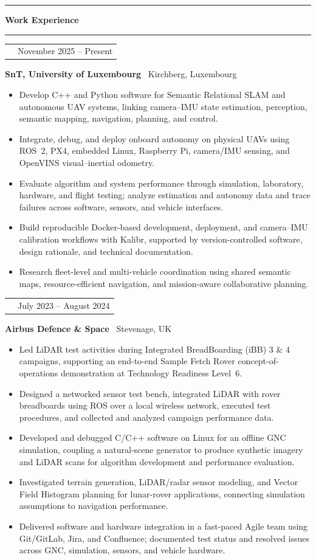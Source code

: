 \documentclass[10pt,a4paper]{article}
\makeatletter
\newcommand{\SectionSize}{11.5pt}
\newcommand{\RoleSize}{10.3pt}
\newcommand{\CompanySize}{9.6pt}
\newcommand{\DurationSize}{9pt}
\newcommand{\BodySize}{9.2pt}
\newcommand{\SectionLineSize}{12pt}
\newcommand{\RoleLineSize}{11.5pt}
\newcommand{\CompanyLineSize}{10.8pt}
\newcommand{\DurationLineSize}{9pt}
\newcommand{\BodyLineSize}{11pt}
\newcommand{\HeaderAfter}{-5pt}
\newcommand{\StatementAfter}{4pt}
\newcommand{\SectionBefore}{4pt}
\newcommand{\SectionTitleToLine}{2pt}
\newcommand{\SectionLineToEntry}{0pt}
\newcommand{\EntryBefore}{0pt}
\newcommand{\RoleToCompany}{-5pt}
\newcommand{\CompanyToBullets}{3pt}
\newcommand{\EntryAfter}{6pt}
\newcommand{\BulletSpacing}{2pt}
\newcommand{\BulletBefore}{0pt}
\newcommand{\BulletIndent}{1.25em}
\newcommand{\SubsectionLineThickness}{0.4pt}
\newcommand{\CVLineThickness}{0.5pt}
\newcommand{\DurationWidth}{4.5cm}
\newcommand{\CVLine}{
    \vspace{\HeaderAfter}
    \noindent
    \textcolor{CVBlack}{
        \rule{\textwidth}{\CVLineThickness}
    }
    \vspace{\HeaderAfter}
}
\newcommand{\CVFirstSection}[1]{

    \vspace{\SectionBefore}


    {\fontsize{\SectionSize}{\SectionLineSize}
    \selectfont
    \textbf{\textcolor{CVBlack}{#1}}}

    \vspace{\SectionTitleToLine}


    \noindent
    \textcolor{CVLightGray}{
        \rule{\textwidth}{\SubsectionLineThickness}
    }

    \vspace{\SectionLineToEntry}
}
\newcommand{\CVEntry}[5]{

    \vspace{\EntryBefore}


    \noindent
    \begin{tabularx}{\textwidth}{
        @{}
        >{\raggedright\arraybackslash}X
        >{\raggedleft\arraybackslash}p{\DurationWidth}
        @{}
    }

        {\fontsize{\RoleSize}{\RoleLineSize}
        \selectfont
        \textbf{\textcolor{CVBlack}{#1}}}
        &
        {\fontsize{\DurationSize}{\DurationLineSize}
        \selectfont
        \textcolor{CVGray}{#4}}

    \end{tabularx}

    \vspace{\RoleToCompany}


    \noindent
    {\fontsize{\CompanySize}{\CompanyLineSize}
    \selectfont
    \textbf{\textcolor{CVDarkGray}{#2}}
    \textcolor{CVGray}{\textbar\ #3}}

    \vspace{\CompanyToBullets}


    \begin{itemize}[
        leftmargin=\BulletIndent,
        itemsep=\BulletSpacing,
        topsep=\BulletBefore,
        parsep=0pt,
        partopsep=0pt
    ]
        #5
    \end{itemize}

    \vspace{\EntryAfter}
}
\newcommand{\CVBullet}[1]{
    \item
    {\fontsize{\BodySize}{\BodyLineSize}
    \selectfont
    \textcolor{CVDarkGray}{#1}}
}
\makeatother
\begin{document}
\vspace{\StatementAfter}

\CVLine


\CVFirstSection{Work Experience}

\CVEntry
{Doctoral Researcher -- Aerospace Autonomy \& GNC Software}
{SnT, University of Luxembourg}
{Kirchberg, Luxembourg}
{November 2025 -- Present}
{
    \CVBullet{Develop C++ and Python software for Semantic Relational SLAM and autonomous UAV systems, linking camera--IMU state estimation, perception, semantic mapping, navigation, planning, and control.}

    \CVBullet{Integrate, debug, and deploy onboard autonomy on physical UAVs using ROS~2, PX4, embedded Linux, Raspberry Pi, camera/IMU sensing, and OpenVINS visual--inertial odometry.}

    \CVBullet{Evaluate algorithm and system performance through simulation, laboratory, hardware, and flight testing; analyze estimation and autonomy data and trace failures across software, sensors, and vehicle interfaces.}

    \CVBullet{Build reproducible Docker-based development, deployment, and camera--IMU calibration workflows with Kalibr, supported by version-controlled software, design rationale, and technical documentation.}

    \CVBullet{Research fleet-level and multi-vehicle coordination using shared semantic maps, resource-efficient navigation, and mission-aware collaborative planning.}
}

\CVEntry
{AOCS/GNC Engineer Intern}
{Airbus Defence \& Space}
{Stevenage, UK}
{July 2023 -- August 2024}
{
    \CVBullet{Led LiDAR test activities during Integrated BreadBoarding (iBB) 3 \& 4 campaigns, supporting an end-to-end Sample Fetch Rover concept-of-operations demonstration at Technology Readiness Level~6.}

    \CVBullet{Designed a networked sensor test bench, integrated LiDAR with rover breadboards using ROS over a local wireless network, executed test procedures, and collected and analyzed campaign performance data.}

    \CVBullet{Developed and debugged C/C++ software on Linux for an offline GNC simulation, coupling a natural-scene generator to produce synthetic imagery and LiDAR scans for algorithm development and performance evaluation.}

    \CVBullet{Investigated terrain generation, LiDAR/radar sensor modeling, and Vector Field Histogram planning for lunar-rover applications, connecting simulation assumptions to navigation performance.}

    \CVBullet{Delivered software and hardware integration in a fast-paced Agile team using Git/GitLab, Jira, and Confluence; documented test status and resolved issues across GNC, simulation, sensors, and vehicle hardware.}
}
\end{document}
